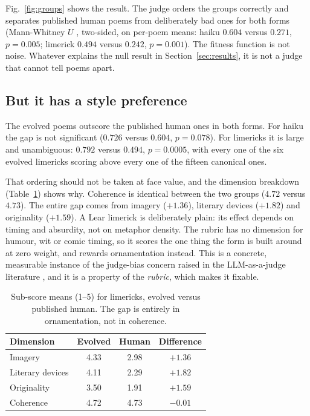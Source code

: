 \documentclass[conference]{IEEEtran}
\begin{document}
Fig.~\ref{fig:groups} shows the result. The judge orders the groups correctly and
separates published human poems from deliberately bad ones for both forms
(Mann-Whitney $U$ \cite{mann1947}, two-sided, on per-poem means: haiku $0.604$
versus $0.271$, $p = 0.005$; limerick $0.494$ versus $0.242$, $p = 0.001$). The
fitness function is not noise. Whatever explains the null result in
Section~\ref{sec:results}, it is not a judge that cannot tell poems apart.

\subsection{But it has a style preference}
The evolved poems outscore the published human ones in both forms. For haiku the
gap is not significant ($0.726$ versus $0.604$, $p = 0.078$). For limericks it is
large and unambiguous: $0.792$ versus $0.494$, $p = 0.0005$, with every one of
the six evolved limericks scoring above every one of the fifteen canonical ones.

That ordering should not be taken at face value, and the dimension breakdown
(Table~\ref{tab:dims}) shows why. Coherence is identical between the two groups
($4.72$ versus $4.73$). The entire gap comes from imagery ($+1.36$), literary
devices ($+1.82$) and originality ($+1.59$). A Lear limerick is deliberately
plain: its effect depends on timing and absurdity, not on metaphor density. The
rubric has no dimension for humour, wit or comic timing, so it scores the one
thing the form is built around at zero weight, and rewards ornamentation instead.
This is a concrete, measurable instance of the judge-bias concern raised in the
LLM-as-a-judge literature \cite{zheng2023,wang2024fair}, and it is a property of
the \emph{rubric}, which makes it fixable.

\begin{table}[t]
\caption{Sub-score means (1--5) for limericks, evolved versus published human.
The gap is entirely in ornamentation, not in coherence.}
\label{tab:dims}
\centering\footnotesize
\begin{tabular}{lccc}
\toprule
Dimension & Evolved & Human & Difference \\
\midrule
Imagery           & 4.33 & 2.98 & $+1.36$ \\
Literary devices  & 4.11 & 2.29 & $+1.82$ \\
Originality       & 3.50 & 1.91 & $+1.59$ \\
Coherence         & 4.72 & 4.73 & $-0.01$ \\
\bottomrule
\end{tabular}
\end{table}
\end{document}
